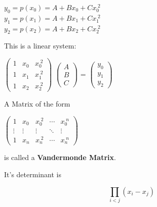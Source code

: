 \documentclass[a4paper,12pt,]{report}
\begin{document}
\begin{center}
	$y_0 = p(x_0) = A + Bx_0 + Cx_0 ^{\;2}$\\
	\medskip
	$y_1 = p(x_1) = A + Bx_1 + Cx_1 ^{\;2}$\\
	\medskip
	$y_2 = p(x_2) = A + Bx_2 + Cx_2 ^{\;2}$\\
\end{center}

This is a linear system:

\begin{center}
	$
	\begin{pmatrix}
		1 & x_0 & x_0^{\;2} \\
		1 & x_1 & x_1^{\;2} \\
		1 & x_2 & x_2^{\;2}
	\end{pmatrix}
	$
	\nolinebreak
	$
	\begin{pmatrix}
		A\\
		B\\
		C
	\end{pmatrix}
	$
		=
	$
	\begin{pmatrix}
		y_0\\
		y_1\\
		y_2	
	\end{pmatrix}
	$
\end{center}

\begin{center}
\fbox
{
	\parbox{0.5\textwidth}
	{
	\begin{center}
		A Matrix of the form
		\bigskip
		
			$\begin{pmatrix}
				1 & x_0 & x_0^{\;2} & \cdots & x_0^{\; n}\\
				\vdots & \vdots & \vdots & \ddots & \vdots\\
				1 & x_n & x_n^{\;2} & \cdots & x_n^{\; n}
			\end{pmatrix}$

		\bigskip		
		 is called a \textbf{Vandermonde Matrix}.
	\end{center}
	}
}
\end{center}

\bigskip

	\noindent It's determinant is

\vspace{-0.75cm}

\begin{center}
	\begin{equation*}
		\prod_{i<j}(x_i - x_j)
	\end{equation*}
\end{center}
\end{document}
